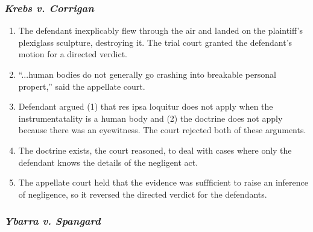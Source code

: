 \subsubsection{\emph{Krebs v. Corrigan}}

\begin{enumerate}
    \item The defendant inexplicably flew through the air and landed on the plaintiff's plexiglass sculpture, destroying it. The trial court granted the defendant's motion for a directed verdict.
    \item ``...human bodies do not generally go crashing into breakable personal propert,'' said the appellate court.
    \item Defendant argued (1) that res ipsa loquitur does not apply when the instrumentatality is a human body and (2) the doctrine does not apply because there was an eyewitness. The court rejected both of these arguments.
    \item The doctrine exists, the court reasoned, to deal with cases where only the defendant knows the details of the negligent act.
    \item The appellate court held that the evidence was suffficient to raise an inference of negligence, so it reversed the directed verdict for the defendants.
\end{enumerate}

\subsubsection{\emph{Ybarra v. Spangard}}

